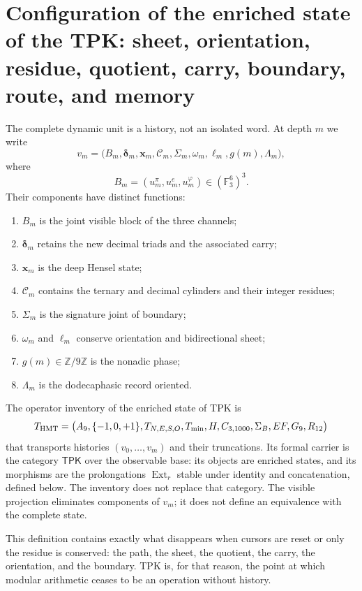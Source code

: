 \section{Configuration of the enriched state of the TPK: sheet, orientation, residue, quotient, carry, boundary, route, and memory}

The complete dynamic unit is a history, not an isolated word. At
depth \(m\) we write
\[
 v_m=
 \bigl(
 B_m,\boldsymbol\delta_m,\boldsymbol x_m,
 \boldsymbol{\mathcal C}_m,\Sigma_m,
 \omega_m,\ell_m,g(m),\Lambda_m
 \bigr),
\]
where
\[
 B_m=(u_m^\pi,u_m^e,u_m^\varphi)\in(\mathbb F_3^6)^3.
\]
Their components have distinct functions:
\begin{enumerate}
 \item \(B_m\) is the joint visible block of the three channels;
 \item \(\boldsymbol\delta_m\) retains the new decimal triads and the
       associated carry;
 \item \(\boldsymbol x_m\) is the deep Hensel state;
 \item \(\boldsymbol{\mathcal C}_m\) contains the ternary and
       decimal cylinders and their integer residues;
 \item \(\Sigma_m\) is the signature joint of boundary;
 \item \(\omega_m\) and \(\ell_m\) conserve orientation and bidirectional sheet;
 \item \(g(m)\in\mathbb Z/9\mathbb Z\) is the nonadic phase;
 \item \(\Lambda_m\) is the dodecaphasic record oriented.
\end{enumerate}

\begin{definition}
The operator inventory of the enriched state of TPK is
\[
 T_{\rm HMT}=
 \bigl(
 A_9,\{-1,0,+1\},T_{N,E,S,O},T_{\min},
 H,C_{3,1000},\Sigma_B,EF,G_9,
 R_{12}
 \bigr)
\]
that transports histories \((v_0,\ldots,v_m)\) and their truncations. Its
formal carrier is the category \(\mathsf{TPK}\) over the observable base:
its objects are enriched states, and its morphisms are the prolongations
\(\operatorname{Ext}_r\) stable under identity and concatenation, defined
below. The inventory does not replace that category. The visible projection
eliminates components of \(v_m\); it does not define an equivalence with the
complete state.
\end{definition}

This definition contains exactly what disappears when
cursors are reset or only the residue is conserved: the path, the sheet, the quotient, the
carry, the orientation, and the boundary. TPK is, for that reason, the point at which
modular arithmetic ceases to be an operation without history.

